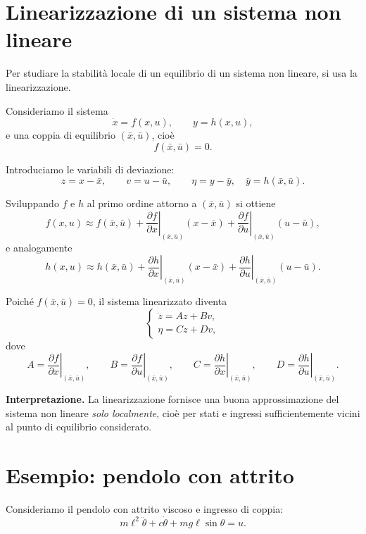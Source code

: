 \bigskip

\section{Linearizzazione di un sistema non lineare}

Per studiare la stabilità locale di un equilibrio di un sistema non lineare, si usa la linearizzazione.

Consideriamo il sistema
\[
\dot x = f(x,u),
\qquad
y=h(x,u),
\]
e una coppia di equilibrio \((\bar x,\bar u)\), cioè
\[
f(\bar x,\bar u)=0.
\]

Introduciamo le variabili di deviazione:
\[
z=x-\bar x,
\qquad
v=u-\bar u,
\qquad
\eta=y-\bar y,
\quad \bar y=h(\bar x,\bar u).
\]

Sviluppando \(f\) e \(h\) al primo ordine attorno a \((\bar x,\bar u)\) si ottiene
\[
f(x,u)\approx
f(\bar x,\bar u)
+\left.\frac{\partial f}{\partial x}\right|_{(\bar x,\bar u)}(x-\bar x)
+\left.\frac{\partial f}{\partial u}\right|_{(\bar x,\bar u)}(u-\bar u),
\]
e analogamente
\[
h(x,u)\approx
h(\bar x,\bar u)
+\left.\frac{\partial h}{\partial x}\right|_{(\bar x,\bar u)}(x-\bar x)
+\left.\frac{\partial h}{\partial u}\right|_{(\bar x,\bar u)}(u-\bar u).
\]

Poiché \(f(\bar x,\bar u)=0\), il sistema linearizzato diventa
\[
\begin{cases}
\dot z = Az + Bv,\\
\eta = Cz + Dv,
\end{cases}
\]
dove
\[
A=\left.\frac{\partial f}{\partial x}\right|_{(\bar x,\bar u)},
\qquad
B=\left.\frac{\partial f}{\partial u}\right|_{(\bar x,\bar u)},
\qquad
C=\left.\frac{\partial h}{\partial x}\right|_{(\bar x,\bar u)},
\qquad
D=\left.\frac{\partial h}{\partial u}\right|_{(\bar x,\bar u)}.
\]

\medskip

\noindent
\textbf{Interpretazione.}
La linearizzazione fornisce una buona approssimazione del sistema non lineare \emph{solo localmente}, cioè per stati e ingressi sufficientemente vicini al punto di equilibrio considerato.

\bigskip

\section{Esempio: pendolo con attrito}

Consideriamo il pendolo con attrito viscoso e ingresso di coppia:
\[
m\ell^2\ddot\theta + c\dot\theta + mg\ell \sin\theta = u.
\]

